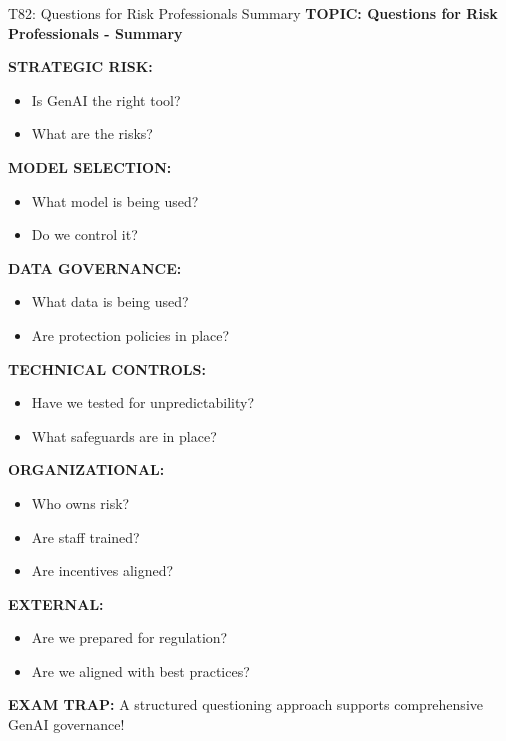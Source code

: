 \documentclass[8pt]{beamer}
\begin{document}
	\begin{frame}{T82: Questions for Risk Professionals Summary}
		\fontsize{6.5}{7.5}\selectfont
		\textbf{TOPIC: Questions for Risk Professionals - Summary}
		
		\vspace{0.1cm}
		\textbf{STRATEGIC RISK:}
		\begin{itemize}
			\item Is GenAI the right tool?
			\item What are the risks?
		\end{itemize}
		
		\vspace{0.1cm}
		\textbf{MODEL SELECTION:}
		\begin{itemize}
			\item What model is being used?
			\item Do we control it?
		\end{itemize}
		
		\vspace{0.1cm}
		\textbf{DATA GOVERNANCE:}
		\begin{itemize}
			\item What data is being used?
			\item Are protection policies in place?
		\end{itemize}
		
		\vspace{0.1cm}
		\textbf{TECHNICAL CONTROLS:}
		\begin{itemize}
			\item Have we tested for unpredictability?
			\item What safeguards are in place?
		\end{itemize}
		
		\vspace{0.1cm}
		\textbf{ORGANIZATIONAL:}
		\begin{itemize}
			\item Who owns risk?
			\item Are staff trained?
			\item Are incentives aligned?
		\end{itemize}
		
		\vspace{0.1cm}
		\textbf{EXTERNAL:}
		\begin{itemize}
			\item Are we prepared for regulation?
			\item Are we aligned with best practices?
		\end{itemize}
		
		\textcolor{myred}{\textbf{EXAM TRAP:}} A structured questioning approach \textcolor{myblue}{supports comprehensive GenAI governance}!
	\end{frame}
	
\end{document}
